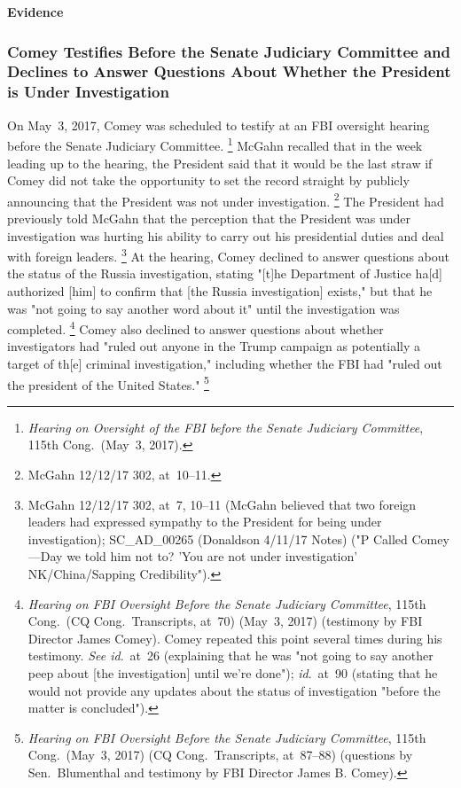 \begin{center}
\textbf{Evidence}
\end{center}

\subsubsection{Comey Testifies Before the Senate Judiciary Committee and Declines to Answer Questions About Whether the President is Under Investigation}

On May~3, 2017, Comey was scheduled to testify at an FBI oversight hearing before the Senate Judiciary Committee.%
\footnote{\textit{Hearing on Oversight of the FBI before the Senate Judiciary Committee}, 115th Cong.\ (May~3, 2017).}
McGahn recalled that in the week leading up to the hearing, the President said that it would be the last straw if Comey did not take the opportunity to set the record straight by publicly announcing that the President was not under investigation.%
\footnote{McGahn 12/12/17 302, at~10--11.}
The President had previously told McGahn that the perception that the President was under investigation was hurting his ability to carry out his presidential duties and deal with foreign leaders.%
\footnote{McGahn 12/12/17 302, at~7, 10--11 (McGahn believed that two foreign leaders had expressed sympathy to the President for being under investigation);
SC\_AD\_00265 (Donaldson 4/11/17 Notes) ("P Called Comey---Day we told him not to? 'You are not under investigation' NK/China/Sapping Credibility").}
At the hearing, Comey declined to answer questions about the status of the Russia investigation, stating "[t]he Department of Justice ha[d] authorized [him] to confirm that [the Russia investigation] exists," but that he was "not going to say another word about it" until the investigation was completed.%
\footnote{\textit{Hearing on FBI Oversight Before the Senate Judiciary Committee}, 115th Cong.\ (CQ Cong.\ Transcripts, at~70) (May~3, 2017) (testimony by FBI Director James Comey).
Comey repeated this point several times during his testimony.
\textit{See id}.~at~26 (explaining that he was "not going to say another peep about [the investigation] until we're done");
\textit{id}.~at~90 (stating that he would not provide any updates about the status of investigation "before the matter is concluded").}
Comey also declined to answer questions about whether investigators had "ruled out anyone in the Trump campaign as potentially a target of th[e] criminal investigation," including whether the FBI had "ruled out the president of the United States."%
\footnote{\textit{Hearing on FBI Oversight Before the Senate Judiciary Committee}, 115th Cong.\ (May~3, 2017) (CQ Cong.\ Transcripts, at~87--88) (questions by Sen.~Blumenthal and testimony by FBI Director James B. Comey).}


